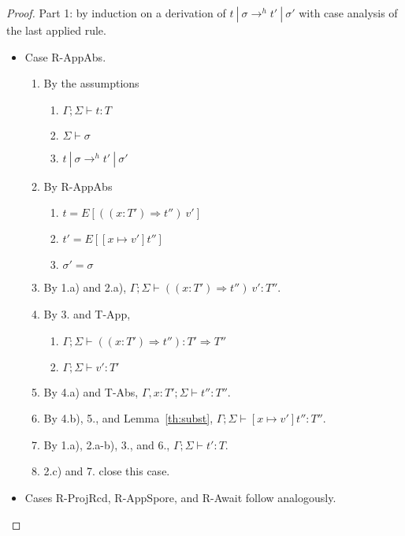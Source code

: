 \documentclass{article}
\theoremstyle{definition}
\begin{document}
\begin{proof}

Part 1: by induction on a derivation of $t~|~\sigma \rightarrow^h t'~|~\sigma'$ with case analysis of the last applied rule.

\begin{itemize}
\item Case R-AppAbs.
\begin{enumerate}
\item By the assumptions
  \begin{enumerate}[label=(\alph*)]
  \item $\Gamma ; \Sigma \vdash t : T$
  \item $\Sigma \vdash \sigma$
  \item $t~|~\sigma \rightarrow^h t'~|~\sigma'$
  \end{enumerate}
\item By R-AppAbs
  \begin{enumerate}[label=(\alph*)]
  \item $t = E[((x : T') \Rightarrow t'')~v']$
  \item $t' = E[[x \mapsto v']t'']$
  \item $\sigma' = \sigma$
  \end{enumerate}
\item By 1.a) and 2.a), $\Gamma ; \Sigma \vdash ((x : T') \Rightarrow t'')~v' : T''$.
\item By 3. and T-App,
  \begin{enumerate}[label=(\alph*)]
  \item $\Gamma ; \Sigma \vdash ((x : T') \Rightarrow t'') : T' \Rightarrow T''$
  \item $\Gamma ; \Sigma \vdash v' : T'$
  \end{enumerate}
\item By 4.a) and T-Abs, $\Gamma , x : T' ; \Sigma \vdash t'' : T''$.
\item By 4.b), 5., and Lemma~\ref{th:subst}, $\Gamma ; \Sigma \vdash [x \mapsto v']t'' : T''$.
\item By 1.a), 2.a-b), 3., and 6., $\Gamma ; \Sigma \vdash t' : T$.
\item 2.c) and 7. close this case.
\end{enumerate}

\item Cases R-ProjRcd, R-AppSpore, and R-Await follow analogously.


\end{itemize}
\end{proof}
\end{document}

